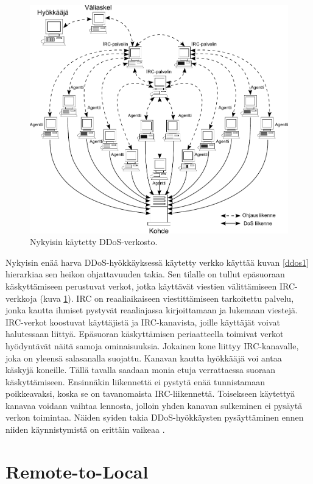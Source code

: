 \begin{figure}[p]
\centering
\includegraphics[width=12cm]{pics/ddos_uusi.pdf}
\caption{Nykyisin käytetty DDoS-verkosto.}
\label{ddos2}
\end{figure}

Nykyisin enää harva DDoS-hyökkäyksessä käytetty verkko käyttää kuvan
\ref{ddos1} hierarkiaa sen heikon ohjattavuuden takia. Sen tilalle
on tullut epäsuoraan käskyttämiseen perustuvat verkot, jotka käyttävät
viestien välittämiseen IRC-verkkoja (kuva \ref{ddos2}). IRC on
reaaliaikaiseen viestittämiseen tarkoitettu palvelu, jonka kautta
ihmiset pystyvät reaaliajassa kirjoittamaan ja lukemaan
viestejä. IRC-verkot koostuvat käyttäjistä ja IRC-kanavista, joille
käyttäjät voivat halutessaan liittyä. Epäsuoran käskyttämisen
periaatteella toimivat verkot hyödyntävät näitä samoja
ominaisuuksia. Jokainen kone liittyy IRC-kanavalle, joka on yleensä
salasanalla suojattu. Kanavan kautta hyökkääjä voi antaa käskyjä
koneille. Tällä tavalla saadaan monia etuja verrattaessa suoraan
käskyttämiseen.  Ensinnäkin liikennettä ei pystytä enää tunnistamaan
poikkeavaksi, koska se on tavanomaista IRC-liikennettä. Toisekseen
käytettyä kanavaa voidaan vaihtaa lennosta, jolloin yhden kanavan
sulkeminen ei pysäytä verkon toimintaa. Näiden syiden takia
DDoS-hyökkäysten pysäyttäminen ennen niiden käynnistymistä on erittäin
vaikeaa \cite{DDOS}.

\section{Remote-to-Local}

